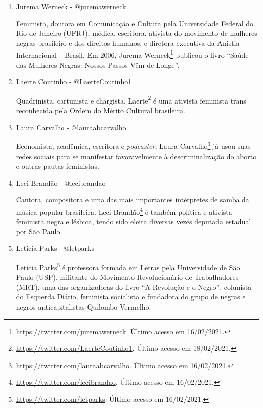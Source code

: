 \documentclass[
	12pt,				%
	openright,			%
	twoside,			%
	a4paper,			%
	english,			%
	brazil				%
	]{abntex2}
\begin{document}
\begin{anexosenv}
\begin{enumerate}
 Juliana Wallauer\footnote{\url{https://twitter.com/jwallauer}. Último acesso em 18/02/2021.} é profissional do marketing e \textit{podcaster}, co-criadora do \textit{podcast} Mamilos juntamente com Cris Bartis (ver \ref{crisbartis}).

 \item Jurema Werneck - @juremawerneck
 
 Feminista, doutora em Comunicação e Cultura pela Universidade Federal do Rio de Janeiro (UFRJ), médica, escritora, ativista do movimento de mulheres negras brasileiro e dos direitos humanos, e diretora executiva da Anistia Internacional -- Brasil. Em 2006, Jurema Werneck\footnote{\url{https://twitter.com/juremawerneck}. Último acesso em 16/02/2021.} publicou o livro ``Saúde das Mulheres Negras: Nossos Passos Vêm de Longe''.

 \item Laerte Coutinho - @LaerteCoutinho1
 
 Quadrinista, cartunista e chargista, Laerte\footnote{\url{https://twitter.com/LaerteCoutinho1}. Último acesso em 18/02/2021.} é uma ativista feminista trans reconhecida pela Ordem do Mérito Cultural brasileira.
 
 \item Laura Carvalho - @lauraabcarvalho
 
 Economista, acadêmica, escritora e \textit{podcaster}, Laura Carvalho\footnote{\url{https://twitter.com/lauraabcarvalho}. Último acesso em 16/02/2021.} já usou suas redes sociais para se manifestar favoravelmente à descriminalização do aborto e outras pautas feministas.

 \item Leci Brandão - @lecibrandao
 
 Cantora, compositora e uma das mais importantes intérpretes de samba da música popular brasileira. Leci Brandão\footnote{\url{https://twitter.com/lecibrandao}. Último acesso em 16/02/2021.} é também política e ativista feminista negra e lésbica, tendo sido eleita diversas vezes deputada estadual por São Paulo.

 \item Letícia Parks - @letparks
 
 Letícia Parks\footnote{\url{https://twitter.com/letparks}. Último acesso em 16/02/2021.} é professora formada em Letras pela Universidade de São Paulo (USP), militante do Movimento Revolucionário de Trabalhadores (MRT), uma das organizadoras do livro ``A Revolução e o Negro'', colunista do Esquerda Diário, feminista socialista e fundadora do grupo de negras e negros anticapitalistas Quilombo Vermelho.


\end{enumerate}
\end{anexosenv}
\end{document}
